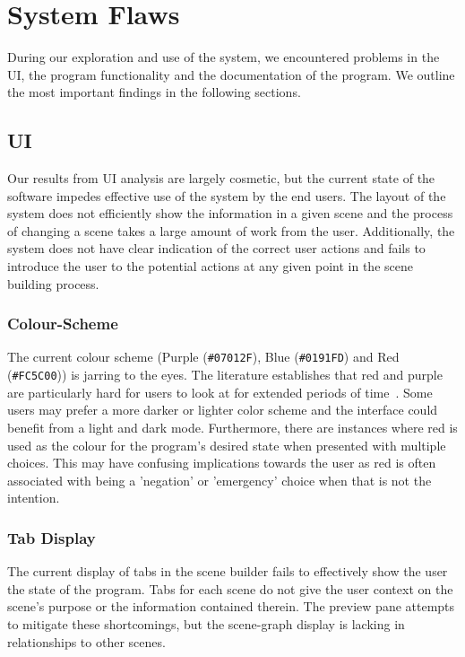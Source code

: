 \documentclass[sigart]{acmart_mod} %
\begin{document}
\section{System Flaws}\label{sec:flaws}
During our exploration and use of the system, we encountered problems in the UI, the program functionality and the documentation of the program. We outline the most important findings in the following sections.
\subsection{UI}
Our results from UI analysis are largely cosmetic, but the current state of the software impedes effective use of the system by the end users. The layout of the system does not efficiently show the information in a given scene and the process of changing a scene takes a large amount of work from the user. Additionally, the system does not have clear indication of the correct user actions and fails to introduce the user to the potential actions at any given point in the scene building process.

\subsubsection{Colour-Scheme}
The current colour scheme (Purple (\verb|#07012F|), Blue (\verb|#0191FD|) and Red (\verb|#FC5C00|)) is jarring to the eyes. The literature establishes that red and purple are particularly hard for users to look at for extended periods of time~\cite{jonesHumancomputerInteractionDesign1989}. Some users may prefer a more darker or lighter color scheme and the interface could benefit from a light and dark mode. Furthermore, there are instances where red is used as the colour for the program's desired state when presented with multiple choices. This may have confusing implications towards the user as red is often associated with being a 'negation' or 'emergency' choice when that is not the intention.

\subsubsection{Tab Display}
The current display of tabs in the scene builder fails to effectively show the user the state of the program. Tabs for each scene do not give the user context on the scene's purpose or the information contained therein. The preview pane attempts to mitigate these shortcomings, but the scene-graph display is lacking in relationships to other scenes.
\end{document}
